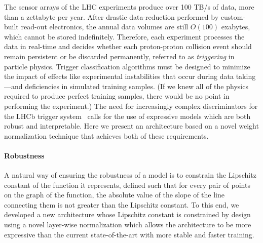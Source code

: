 \documentclass{article}
\begin{document}
The sensor arrays of the LHC experiments produce over 100 TB/s of data, more than a zettabyte per year. 
After drastic data-reduction performed by custom-built read-out electronics, the annual data volumes are still $O(100)$ exabytes, which cannot be stored indefinitely. 
Therefore, each experiment processes the data in real-time and decides whether each proton-proton collision event should remain persistent or be discarded permanently, referred to as {\em triggering} in particle physics.
Trigger classification algorithms must be designed to minimize the impact of effects like experimental instabilities that occur during data taking---and deficiencies in simulated training samples. (If we knew all of the physics required to produce perfect training samples, there would be no point in performing the experiment.) 
The need for increasingly complex discriminators for the LHCb trigger system~\cite{LHCb-DP-2012-004,LHCb-DP-2019-001} calls for the use of expressive models which are both robust and interpretable. Here we present an architecture based on a novel weight normalization technique that achieves both of these requirements. 

\paragraph{Robustness} A natural way of ensuring the robustness of a model is to constrain the Lipschitz constant of the function it represents, 
defined such that for every pair of points on the graph of the function, the absolute value of the slope of the line connecting them is not greater than the Lipschitz constant.
To this end, we developed a new architecture whose Lipschitz constant is constrained by design using a novel layer-wise normalization which allows the architecture to be more expressive than the current state-of-the-art with more stable and faster training.
\end{document}
